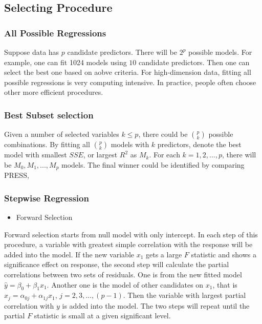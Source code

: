 \documentclass[
  11pt,
  openany]{memoir}
\providecommand{\tightlist}{%
  \setlength{\itemsep}{0pt}\setlength{\parskip}{0pt}}
\begin{document}
\hypertarget{selecting-procedure}{%
\subsection{Selecting Procedure}\label{selecting-procedure}}

\hypertarget{all-possible-regressions}{%
\subsubsection{All Possible Regressions}\label{all-possible-regressions}}

Suppose data has \(p\) candidate predictors. There will be \(2^p\) possible models.
For example, one can fit 1024 models using \(10\) candidate predictors. Then one can select the best one based on aobve criteria.
For high-dimension data, fitting all possible regressions is very computing intensive.
In practice, people often choose other more efficient procedures.

\hypertarget{best-subset-selection}{%
\subsubsection{Best Subset selection}\label{best-subset-selection}}

Given a number of selected variables \(k\le p\), there could be \(p\choose k\) possible combinations. By fitting all \(p\choose k\) models with \(k\) predictors, denote the best model with smallest \(SSE\), or largest \(R^2\) as \(M_k\).
For each \(k=1,2,...,p\), there will be \(M_0,M_1,...,M_p\) models. The final winner could be identified by comparing PRESS,

\hypertarget{stepwise-regression}{%
\subsubsection{Stepwise Regression}\label{stepwise-regression}}

\begin{itemize}
\tightlist
\item
  Forward Selection
\end{itemize}

Forward selection starts from null model with only intercept. In each step of this procedure, a variable with greatest simple correlation with the response will be added into the model. If the new variable \(x_1\) gets a large \(F\) statistic and shows a significance effect on response, the second step will calculate the partial correlations between two sets of residuals. One is from the new fitted model \(\hat y=\beta_0+\beta_1x_1\). Another one is the model of other candidates on \(x_1\), that is \(\hat x_j=\alpha_{0j}+\alpha_{1j}x_1\), \(j=2,3,...,(p-1)\). Then the variable with largest partial correlation with \(y\) is added into the model.
The two steps will repeat until the partial \(F\) statistic is small at a given significant level.
\end{document}
